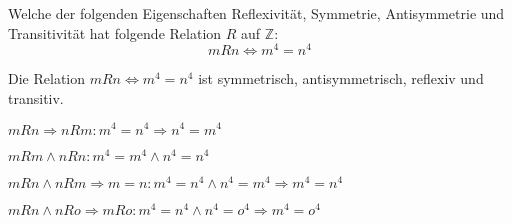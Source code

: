 \documentclass[a4paper, margins=2.5cm]{homework}
\newcommand{\Z}{\mathbb{Z}}
\begin{document}
\begin{problem}
	Welche der folgenden Eigenschaften Reflexivität, Symmetrie, Antisymmetrie und
	Transitivität hat folgende Relation $R$ auf $\Z$:
	\[ mRn \Longleftrightarrow m^4 = n^4 \]
\end{problem}
\begin{solution}
	Die Relation $mRn \Longleftrightarrow m^4=n^4$ ist symmetrisch, antisymmetrisch, 
	reflexiv und transitiv.
	\begin{description}\itemsep0pt
		\item[Symmetrie] $mRn \Longrightarrow nRm: m^4= n^4 \Longrightarrow n^4=m^4$ \hfill \\
		\item[Reflexivität] $mRm \wedge nRn: m^4=m^4 \wedge n^4=n^4$ \hfill \\
		\item[Antisymmetrie] $mRn \wedge nRm \Longrightarrow m=n: m^4=n^4 \wedge n^4=m^4 \Longrightarrow m^4=n^4$ \hfill \\
		\item[Transitivität] $mRn \wedge nRo \Longrightarrow mRo: m^4=n^4 \wedge n^4=o^4 \Longrightarrow m^4=o^4$
	\end{description}
\end{solution}
\end{document}

